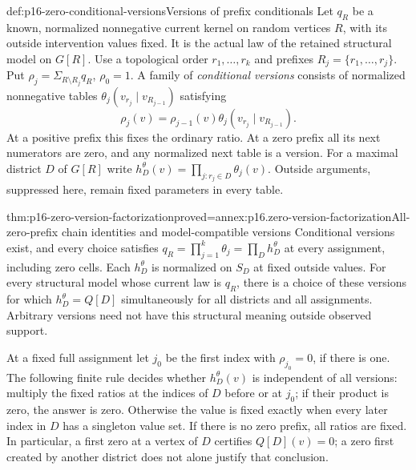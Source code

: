 \begin{hbdefinition}{def:p16-zero-conditional-versions}{Versions of prefix conditionals}
Let \(q_R\) be a known, normalized nonnegative current kernel
on random vertices \(R\), with its outside intervention values fixed.
It is the actual law of the retained structural model on \(G[R]\).
Use a topological order \(r_1,\ldots,r_k\) and prefixes
\(R_j=\{r_1,\ldots,r_j\}\). Put
\(\rho_j=\Sigma_{R\setminus R_j}q_R\), \(\rho_0=1\).
A family of \emph{conditional versions} consists of normalized
nonnegative tables \(\theta_j(v_{r_j}\mid v_{R_{j-1}})\)
satisfying
\[
 \rho_j(v)=\rho_{j-1}(v)\theta_j(v_{r_j}\mid v_{R_{j-1}}).
\]
At a positive prefix this fixes the ordinary ratio. At a zero
prefix all its next numerators are zero, and any normalized next
table is a version. For a maximal district \(D\) of \(G[R]\)
write \(h_D^\theta(v)=\prod_{j:r_j\in D}\theta_j(v)\).
Outside arguments, suppressed here, remain fixed parameters in every table.
\end{hbdefinition}

\begin{hbtheorem}{thm:p16-zero-version-factorization}{proved=annex:p16.zero-version-factorization}{All-zero-prefix chain identities and model-compatible versions}
Conditional versions exist, and every choice satisfies
\(q_R=\prod_{j=1}^k\theta_j=\prod_D h_D^\theta\) at every
assignment, including zero cells. Each \(h_D^\theta\) is normalized
on \(S_D\) at fixed outside values. For every structural model
whose current law is \(q_R\), there is a choice of these versions
for which \(h_D^\theta=Q[D]\) simultaneously for all districts
and all assignments. Arbitrary versions need not have this structural
meaning outside observed support.

At a fixed full assignment let \(j_0\) be the first index with
\(\rho_{j_0}=0\), if there is one. The following finite rule
decides whether \(h_D^\theta(v)\) is independent of all versions:
multiply the fixed ratios at the indices of \(D\) before or at
\(j_0\); if their product is zero, the answer is zero. Otherwise
the value is fixed exactly when every later index in \(D\) has
a singleton value set. If there is no zero prefix, all ratios are
fixed. In particular, a first zero at a vertex of \(D\) certifies
\(Q[D](v)=0\); a zero first created by another district does
not alone justify that conclusion.
\end{hbtheorem}

